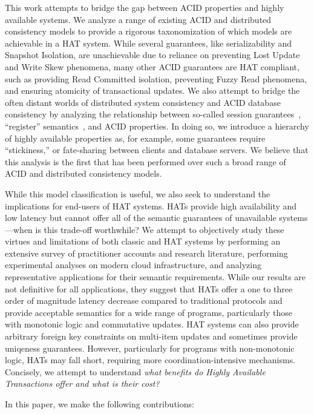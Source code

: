 This work attempts to bridge the gap between ACID properties and
highly available systems. We analyze a range of existing ACID and
distributed consistency models to provide a rigorous taxonomization of
which models are achievable in a HAT system.  While several
guarantees, like serializability and Snapshot Isolation, are
unachievable due to reliance on preventing Lost Update and Write Skew
phenomena, many other ACID guarantees are HAT compliant, such as
providing Read Committed isolation, preventing Fuzzy Read phenomena,
and ensuring atomicity of transactional updates. We also attempt to
bridge the often distant worlds of distributed system consistency and
ACID database consistency by analyzing the relationship between
so-called session guarantees~\cite{sessionguarantees}, ``register''
semantics~\cite{herlihy-art}, and ACID properties. In doing so, we
introduce a hierarchy of highly available properties as, for example,
some guarantees require ``stickiness,'' or fate-sharing between
clients and database servers. We believe that this analysis is the
first that has been performed over such a broad range of ACID and
distributed consistency models.

While this model classification is useful, we also seek to understand
the implications for end-users of HAT systems. HATs provide high
availability and low latency but cannot offer all of the semantic
guarantees of unavailable systems---when is this trade-off worthwhile?
We attempt to objectively study these virtues and limitations of both
classic and HAT systems by performing an extensive survey of
practitioner accounts and research literature, performing experimental
analyses on modern cloud infrastructure, and analyzing representative
applications for their semantic requirements. While our results are
not definitive for all applications, they suggest that HATs offer a
one to three order of magnitude latency decrease compared to
traditional protocols and provide acceptable semantics for a wide
range of programs, particularly those with monotonic logic and
commutative updates. HAT systems can also provide arbitrary foreign
key constraints on multi-item updates and sometimes provide uniqeness
guarantees. However, particularly for programs with non-monotonic
logic, HATs may fall short, requiring more coordination-intensive
mechanisms. Concisely, we attempt to understand \textit{what benefits
  do Highly Available Transactions offer and what is their cost?}

In this paper, we make the following contributions:

